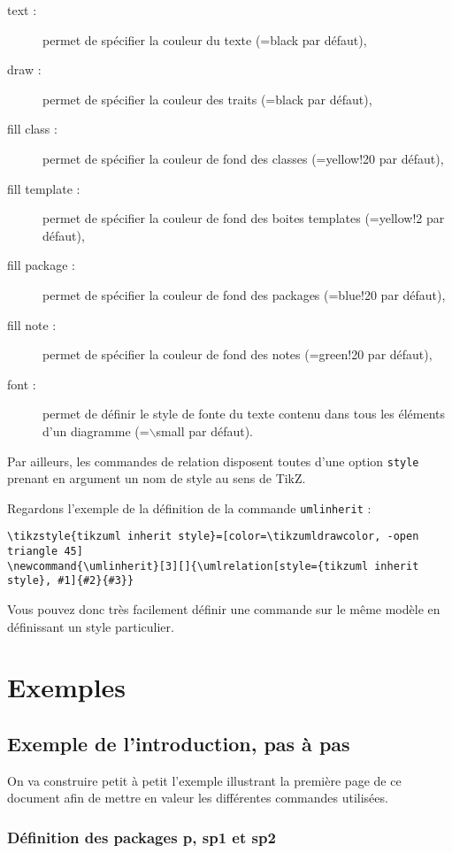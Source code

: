 \documentclass[a4paper,11pt]{report}
\newcommand{\TikZ}{{\sc TikZ}}
\begin{document}
\begin{description}
\item[text : ] permet de spécifier la couleur du texte (=black par défaut),
\item[draw :] permet de spécifier la couleur des traits (=black par défaut),
\item[fill class :] permet de spécifier la couleur de fond des classes (=yellow!20 par défaut),
\item[fill template :] permet de spécifier la couleur de fond des boites templates (=yellow!2 par défaut),
\item[fill package :] permet de spécifier la couleur de fond des packages (=blue!20 par défaut),
\item[fill note :] permet de spécifier la couleur de fond des notes (=green!20 par défaut),
\item[font :] permet de définir le style de fonte du texte contenu dans tous les éléments d'un diagramme (=$\backslash$small par défaut).
\end{description}

Par ailleurs, les commandes de relation disposent toutes d'une option {\tt style} prenant en argument un nom de style au sens de \TikZ.

Regardons l'exemple de la définition de la commande {\tt umlinherit} :

\begin{lstlisting}
\tikzstyle{tikzuml inherit style}=[color=\tikzumldrawcolor, -open triangle 45]
\newcommand{\umlinherit}[3][]{\umlrelation[style={tikzuml inherit style}, #1]{#2}{#3}}
\end{lstlisting}

Vous pouvez donc très facilement définir une commande sur le même modèle en définissant un style particulier.

\section{Exemples}

\subsection{Exemple de l'introduction, pas à pas}

On va construire petit à petit l'exemple illustrant la première page de ce document afin de mettre en valeur les différentes commandes utilisées.

\subsubsection{Définition des packages p, sp1 et sp2}
\end{document}
